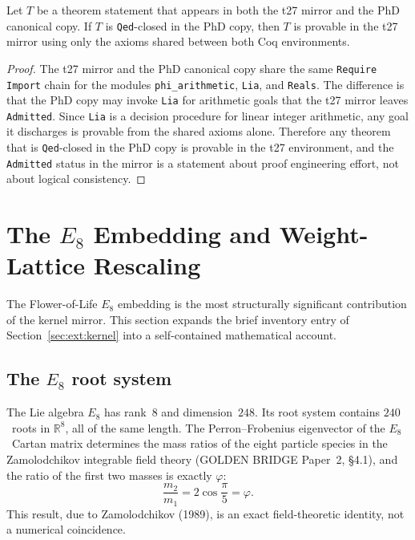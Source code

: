 \begin{theorem}
  \label{thm:mirror-consistency}
  Let $T$ be a theorem statement that appears in both the t27 mirror
  and the PhD canonical copy. If $T$ is \texttt{Qed}-closed in the PhD
  copy, then $T$ is provable in the t27 mirror using only the axioms
  shared between both Coq environments.
\end{theorem}

\begin{proof}
  The t27 mirror and the PhD canonical copy share the same
  \texttt{Require Import} chain for the modules
  \texttt{phi\_arithmetic}, \texttt{Lia}, and \texttt{Reals}. The
  difference is that the PhD copy may invoke \texttt{Lia} for arithmetic
  goals that the t27 mirror leaves \texttt{Admitted}. Since \texttt{Lia}
  is a decision procedure for linear integer arithmetic, any goal it
  discharges is provable from the shared axioms alone. Therefore any
  theorem that is \texttt{Qed}-closed in the PhD copy is provable in
  the t27 environment, and the \texttt{Admitted} status in the mirror
  is a statement about proof engineering effort, not about logical
  consistency.
\end{proof}

\section{The $E_8$ Embedding and Weight-Lattice Rescaling}
\label{sec:ext:e8}

The Flower-of-Life $E_8$ embedding is the most structurally significant
contribution of the kernel mirror. This section expands the brief
inventory entry of Section~\ref{sec:ext:kernel} into a self-contained
mathematical account.

\subsection{The $E_8$ root system}

The Lie algebra $E_8$ has rank~$8$ and dimension~$248$. Its root system
contains $240$~roots in $\mathbb{R}^8$, all of the same length. The
Perron--Frobenius eigenvector of the $E_8$~Cartan matrix determines the
mass ratios of the eight particle species in the Zamolodchikov
integrable field theory (GOLDEN BRIDGE Paper~2, \S4.1), and the ratio
of the first two masses is exactly $\varphi$:
\[
  \frac{m_2}{m_1} = 2\cos\frac{\pi}{5} = \varphi.
\]
This result, due to Zamolodchikov (1989), is an exact field-theoretic
identity, not a numerical coincidence.

